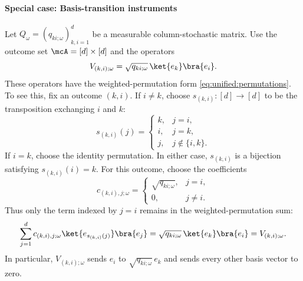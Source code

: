 \documentclass[a4paper]{article}
\numberwithin{equation}{section}   %
\theoremstyle{plain}   %
\theoremstyle{plain}   %
\theoremstyle{examplestyle}
\begin{document}
        \paragraph{Special case: Basis-transition instruments}
        \label{par:basis-transition-instruments}
            Let $Q_\omega=(q_{ki;\omega})_{k,i=1}^d$ be a measurable column-stochastic matrix. 
            Use the outcome set $\mcA=[d]\times[d]$ and the operators
            \[
                 V_{(k,i);\omega}
                 =\sqrt{q_{ki;\omega}}\,\ket{e_k}\bra{e_i}.
            \]
            These operators have the weighted-permutation form \eqref{eq:unified:permutations}. 
            To see this, fix an outcome $(k,i)$. If $i\ne k$, choose $s_{(k,i)}:[d]\to[d]$ to be the transposition exchanging $i$ and $k$:
            \[
                 s_{(k,i)}(j)=
                     \begin{cases}
                      k, & j=i,\\
                      i, & j=k,\\
                      j, & j\notin\{i,k\}.
                     \end{cases}
            \]
            If $i=k$, choose the identity permutation.
            In either case, $s_{(k,i)}$ is a bijection satisfying   $s_{(k,i)}(i)=k$.
            For this outcome, choose the coefficients
            \[
                 c_{(k,i),j;\omega}
                 =
                 \begin{cases}
                  \sqrt{q_{ki;\omega}}, & j=i,\\
                  0, & j\ne i.
                 \end{cases}
            \]
            Thus only the term indexed by $j=i$ remains in the weighted-permutation sum:
            \[
                 \sum_{j=1}^d c_{(k,i),j;\omega}
                 \ket{e_{s_{(k,i)}(j)}}\bra{e_j}
                 =
                 \sqrt{q_{ki;\omega}}\,\ket{e_k}\bra{e_i}
                 =
                 V_{(k,i);\omega}.
            \]
            In particular, $V_{(k,i);\omega}$ sends $e_i$ to $\sqrt{q_{ki;\omega}}\,e_k$ and sends every other basis vector to zero.
    
\end{document}

